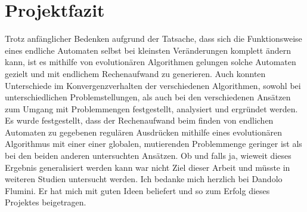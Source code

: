 \clearpage
\section{Projektfazit}
Trotz anfänglicher Bedenken aufgrund der Tatsache, dass sich die Funktionsweise eines endliche Automaten selbst bei kleinsten Veränderungen komplett ändern kann, ist es mithilfe von evolutionären Algorithmen gelungen solche Automaten gezielt und mit endlichem Rechenaufwand zu generieren. Auch konnten Unterschiede im Konvergenzverhalten der verschiedenen Algorithmen, sowohl bei unterschiedlichen Problemstellungen, als auch bei den verschiedenen Ansätzen zum Umgang mit Problemmengen festgestellt, analysiert und ergründet werden. Es wurde festgestellt, dass der Rechenaufwand beim finden von endlichen Automaten zu gegebenen regulären Ausdrücken mithilfe eines evolutionären Algorithmus mit einer einer globalen, mutierenden Problemmenge geringer ist als bei den beiden anderen untersuchten Ansätzen. Ob und falls ja, wieweit dieses Ergebnis generalisiert werden kann war nicht Ziel dieser Arbeit und müsste in weiteren Studien untersucht werden. Ich bedanke mich herzlich bei Dandolo Flumini. Er hat mich mit guten Ideen beliefert und so zum Erfolg dieses Projektes beigetragen.